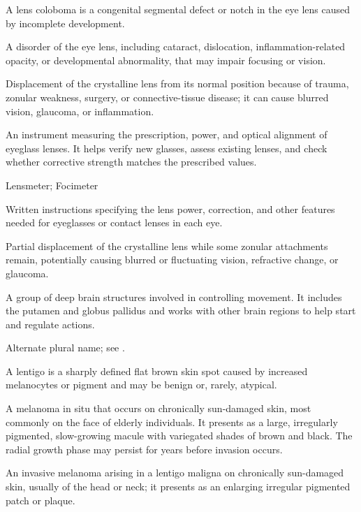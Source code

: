  A lens coloboma is a congenital segmental defect or notch in the eye lens caused by incomplete development.

 A disorder of the eye lens, including cataract, dislocation, inflammation-related opacity, or developmental abnormality, that may impair focusing or vision.

 Displacement of the crystalline lens from its normal position because of trauma, zonular weakness, surgery, or connective-tissue disease; it can cause blurred vision, glaucoma, or inflammation.

 An instrument measuring the prescription, power, and optical alignment of eyeglass lenses. It helps verify new glasses, assess existing lenses, and check whether corrective strength matches the prescribed values.

\synonyms
Lensmeter; Focimeter

 Written instructions specifying the lens power, correction, and other features needed for eyeglasses or contact lenses in each eye.

 Partial displacement of the crystalline lens while some zonular attachments remain, potentially causing blurred or fluctuating vision, refractive change, or glaucoma.

 A group of deep brain structures involved in controlling movement. It includes the putamen and globus pallidus and works with other brain regions to help start and regulate actions.

 Alternate plural name; see .

 A lentigo is a sharply defined flat brown skin spot caused by increased melanocytes or pigment and may be benign or, rarely, atypical.

 A melanoma in situ that occurs on chronically sun-damaged skin, most commonly on the
face of elderly individuals. It presents as a large, irregularly pigmented, slow-growing
macule with variegated shades of brown and black. The radial growth phase may persist
for years before invasion occurs.

 An invasive melanoma arising in a lentigo maligna on chronically sun-damaged skin, usually of the head or neck; it presents as an enlarging irregular pigmented patch or plaque.

